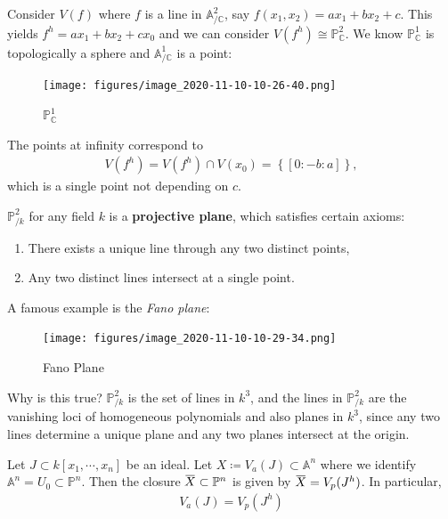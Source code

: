 \begin{example}[?]

Consider \(V(f)\) where \(f\) is a line in
\({\mathbb{A}}^2_{/{\mathbb{C}}}\), say
\(f(x_1, x_2) = ax_1 + bx_2 + c\). This yields
\(f^h = ax_1 + bx_2 + cx_0\) and we can consider
\(V(f^h) \cong {\mathbb{P}}^2_{{\mathbb{C}}}\). We know
\({\mathbb{P}}^1_{{\mathbb{C}}}\) is topologically a sphere and
\({\mathbb{A}}^1_{/{\mathbb{C}}}\) is a point:

\begin{figure}
\centering
\texttt{[image: figures/image\_2020-11-10-10-26-40.png]}
\caption{\({\mathbb{P}}^1_{{\mathbb{C}}}\)}
\end{figure}

The points at infinity correspond to
\begin{align*}  
V(f^h) = V(f^h) \cap V(x_0) = \left\{{{\left[ {0:-b:a} \right]}}\right\}
,\end{align*}
which is a single point not depending on \(c\).

\end{example}

\begin{remark}

\({\mathbb{P}}^2_{/k}\) for any field \(k\) is a \textbf{projective
plane}, which satisfies certain axioms:

\begin{enumerate}
\def\labelenumi{\arabic{enumi}.}
\item
  There exists a unique line through any two distinct points,
\item
  Any two distinct lines intersect at a single point.
\end{enumerate}

A famous example is the \emph{Fano plane}:

\begin{figure}
\centering
\texttt{[image: figures/image\_2020-11-10-10-29-34.png]}
\caption{Fano Plane}
\end{figure}

Why is this true? \({\mathbb{P}}^2_{/k}\) is the set of lines in
\(k^3\), and the lines in \({\mathbb{P}}^2_{/k}\) are the vanishing loci
of homogeneous polynomials and also planes in \(k^3\), since any two
lines determine a unique plane and any two planes intersect at the
origin.

\end{remark}

\begin{proposition}[?]

Let \(J\subset k[x_1, \cdots, x_{n}]\) be an ideal. Let
\(X \coloneqq V_a(J) \subset {\mathbb{A}}^n\) where we identify
\({\mathbb{A}}^n = U_0 \subset {\mathbb{P}}^n\). Then the closure
\(\mkern 1.5mu\overline{\mkern-1.5muX\mkern-1.5mu}\mkern 1.5mu \subset {\mathbb{P}}^n\)
is given by
\(\mkern 1.5mu\overline{\mkern-1.5muX\mkern-1.5mu}\mkern 1.5mu = V_p(J^h)\).
In particular,
\begin{align*}
V_a(J) = V_p(J^h)
\end{align*}

\end{proposition}

